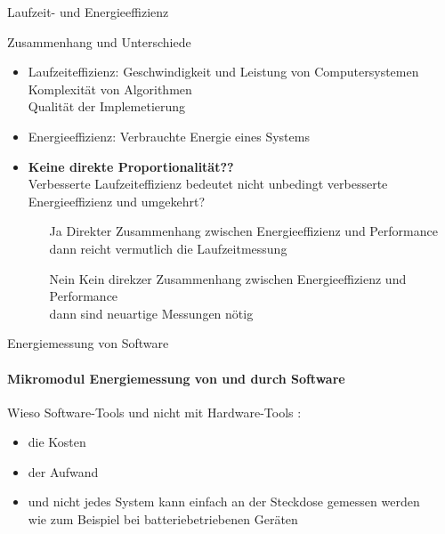 \begin{frame}{Laufzeit- und Energieeffizienz}

  Zusammenhang und Unterschiede
	    \begin{itemize}
		    \item Laufzeiteffizienz: Geschwindigkeit und Leistung von Computersystemen\\ Komplexität von Algorithmen\\Qualität der Implemetierung
        \item Energieeffizienz: Verbrauchte Energie eines Systems \cite{brown_toward_2010}
        \item \textbf<2->{Keine direkte Proportionalität?? }\\
		           Verbesserte Laufzeiteffizienz bedeutet nicht unbedingt verbesserte Energieeffizienz und umgekehrt?
							
							\begin{itemize}
								\item[Ja]  Direkter Zusammenhang zwischen Energieeffizienz und Performance 
								           \cite{pereira_energy_2017,cascaval_folklore_2014,pinto_energy_2017}\\
													  dann reicht vermutlich die Laufzeitmessung
													
								\item[Nein] Kein direkzer Zusammenhang zwischen Energieeffizienz und Performance 
								      \cite{trefethen_energy-aware_2013,lima_haskell_2016} \\
											dann sind neuartige Messungen nötig
							\end{itemize}
		\end{itemize}
							
\end{frame}


\begin{frame}{Energiemessung von Software}
\framesubtitle{Mikromodul Energiemessung von und durch Software}

Wieso  Software-Tools und nicht mit Hardware-Tools :
\begin{itemize}
    \item die Kosten 
    \item der Aufwand
    \item und nicht jedes System kann einfach an der Steckdose gemessen werden\\
		          wie zum Beispiel bei batteriebetriebenen Geräten 
\end{itemize}
\end{frame}

